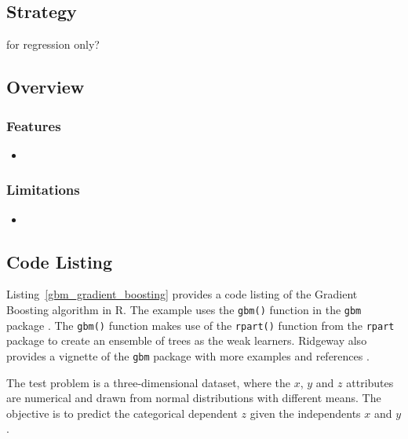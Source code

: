 \subsection{Strategy}


for regression only?



\subsection{Overview}

\subsubsection{Features}

\begin{itemize}
	\item 
\end{itemize}

\subsubsection{Limitations}

\begin{itemize}
	\item 
\end{itemize}


\subsection{Code Listing}
Listing~\ref{gbm_gradient_boosting} provides a code listing of the Gradient Boosting algorithm in R.
The example uses the \texttt{gbm()} function in the \texttt{gbm} package \cite{Ridgeway2007a}. The \texttt{gbm()} function makes use of the \texttt{rpart()} function from the \texttt{rpart} package to create an ensemble of trees as the weak learners.
Ridgeway also provides a vignette of the \texttt{gbm} package with more examples and references \cite{Ridgeway2007}.

The test problem is a three-dimensional dataset, where the $x$, $y$ and $z$ attributes are numerical and drawn from normal distributions with different means. The objective is to predict the categorical dependent $z$ given the independents $x$ and $y$.


